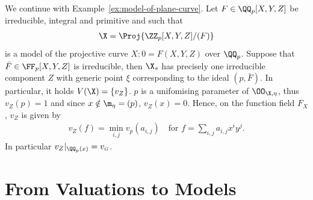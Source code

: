 \begin{example}
    We continue with Example~\ref{ex:model-of-plane-curve}.
    Let $F\in \QQ_p[X,Y,Z]$ be irreducible, integral and primitive and such that
    \begin{align}
        \X = \Proj{\ZZ_p[X,Y,Z]/(F)}
    \end{align}
    is a model of the projective curve $X: 0=F(X,Y,Z)$ over $\QQ_p$.
    Suppose that $\bar{F} \in \FF_p[X,Y,Z]$ is irreducible, then $\X_s$ has precisely one irreducible component $Z$
    with generic point $\xi$ corresponding to the ideal $(p, \bar{F})$.
    In particular, it holds $V(\X) = \lbrace v_Z\rbrace$. 
    $p$ is a unifomising parameter of $\OO_{\X, \eta}$, thus $v_Z(p)=1$ and since $x \notin \m_\eta=(p)$, $v_Z(x)=0$.
    Hence, on the function field $F_X$, $v_Z$ is given by 
    \begin{align}
        v_Z(f) = \min_{i,j}v_p(a_{i,j}) \quad \text{for } f = \sum_{i,j}a_{i,j}x^i y^j.
    \end{align}
    In particular $v_Z|_{\QQ_p(x)} = v_{\scriptscriptstyle G}$.
\end{example}

\section{From Valuations to Models}\label{sec:from-valuations-to-models}

